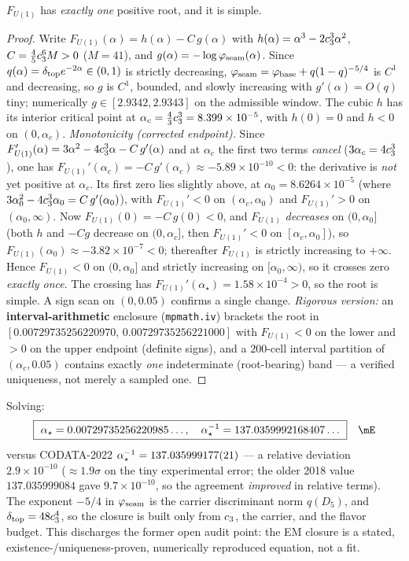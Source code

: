 \begin{lemma}
\label{lem:emclosure}
$F_{U(1)}$ has \emph{exactly one} positive root, and it is simple.
\end{lemma}
\begin{proof}
Write $F_{U(1)}(\alpha)=h(\alpha)-C\,g(\alpha)$ with $h(\alpha)=\alpha^3-2c_3^3\alpha^2$,
$C=\tfrac45c_3^6M>0$ ($M=41$), and $g(\alpha)=-\log\varphi_{\mathrm{seam}}(\alpha)$. Since
$q(\alpha)=\delta_{\mathrm{top}} e^{-2\alpha}\in(0,1)$ is strictly decreasing, $\varphi_{\mathrm{seam}}=\varphi_{\mathrm{base}}+q(1-q)^{-5/4}$ is $C^1$
and decreasing, so $g$ is $C^1$, bounded, and slowly increasing with $g'(\alpha)=O(q)$ tiny; numerically
$g\in[2.9342,2.9343]$ on the admissible window. The cubic $h$ has its interior critical point at
$\alpha_c=\tfrac43c_3^3=8.399\times10^{-5}$, with $h(0)=0$ and $h<0$ on $(0,\alpha_c)$.
\emph{Monotonicity (corrected endpoint).} Since
$F_{U(1)}'(\alpha)=3\alpha^2-4c_3^3\alpha-C\,g'(\alpha)$ and at $\alpha_c$ the first two terms
\emph{cancel} ($3\alpha_c=4c_3^3$), one has $F_{U(1)}'(\alpha_c)=-C\,g'(\alpha_c)\approx-5.89\times10^{-10}<0$:
the derivative is \emph{not} yet positive at $\alpha_c$. Its first zero lies slightly above, at
$\alpha_0=8.6264\times10^{-5}$ (where $3\alpha_0^2-4c_3^3\alpha_0=C\,g'(\alpha_0)$), with $F_{U(1)}'<0$ on
$(\alpha_c,\alpha_0)$ and $F_{U(1)}'>0$ on $(\alpha_0,\infty)$. Now $F_{U(1)}(0)=-C\,g(0)<0$, and
$F_{U(1)}$ \emph{decreases} on $(0,\alpha_0]$ (both $h$ and $-Cg$ decrease on $(0,\alpha_c]$, then $F_{U(1)}'<0$
on $[\alpha_c,\alpha_0]$), so $F_{U(1)}(\alpha_0)\approx-3.82\times10^{-7}<0$; thereafter $F_{U(1)}$ is strictly
increasing to $+\infty$. Hence $F_{U(1)}<0$ on $(0,\alpha_0]$ and strictly increasing on $[\alpha_0,\infty)$, so
it crosses zero \emph{exactly once}. The crossing has $F_{U(1)}'(\alpha_\star)=1.58\times10^{-4}>0$, so the
root is simple. A sign scan on $(0,0.05)$ confirms a single change. \emph{Rigorous version:} an
\textbf{interval-arithmetic} enclosure (\texttt{mpmath.iv}) brackets the root in
$[0.00729735256220970,\,0.00729735256221000]$ with $F_{U(1)}<0$ on the lower and $>0$ on the upper
endpoint (definite signs), and a $200$-cell interval partition of $(\alpha_c,0.05)$ contains exactly
\emph{one} indeterminate (root-bearing) band --- a verified uniqueness, not merely a sampled one.
\end{proof}

\noindent Solving:
\begin{equation}
  \boxed{\ \alpha_\star=0.00729735256220985\ldots,\quad \ainv=137.0359992168407\ldots\ }\quad\mE
\end{equation}
\;
versus CODATA-2022 $\alpha^{-1}_\star=137.035999177(21)$ --- a relative deviation $2.9\times10^{-10}$ ($\approx1.9\sigma$
on the tiny experimental error; the older 2018 value $137.035999084$ gave $9.7\times10^{-10}$, so the
agreement \emph{improved} in relative terms). The exponent $-5/4$ in $\varphi_{\mathrm{seam}}$ is the carrier
discriminant norm $q(D_5)$, and $\delta_{\mathrm{top}}=48c_3^4$, so the closure is built only from $c_3$, the
carrier, and the flavor budget. This discharges the former open audit point: the EM closure is a stated,
existence-/uniqueness-proven, numerically reproduced equation, not a fit.

